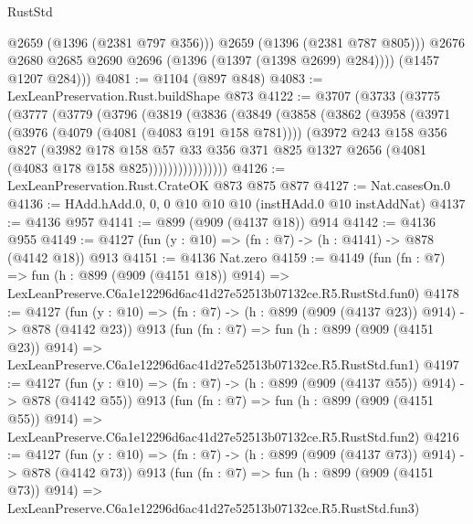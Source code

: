 \begin{lexlean}{RustStd}
\begin{coremodule}
                @2659
                (@1396 (@2381 @797 @356)))
              @2659
              (@1396 (@2381 @787 @805)))
            @2676
            @2680
            @2685
            @2690
            @2696
            (@1396 (@1397 (@1398 @2699) @284))))
        (@1457 @1207 @284)))
@4081 := @1104 (@897 @848)
@4083 := LexLeanPreservation.Rust.buildShape @873
@4122 := @3707
    (@3733
      (@3775
        (@3777
          (@3779
            (@3796
              (@3819
                (@3836
                  (@3849
                    (@3858
                      (@3862
                        (@3958
                          (@3971
                            (@3976 (@4079 (@4081 (@4083 @191 @158 @781))))
                            (@3972
                              @243
                              @158
                              @356
                              @827
                              (@3982
                                @178
                                @158
                                @57
                                @33
                                @356
                                @371
                                @825
                                @1327
                                @2656
                                (@4081 (@4083 @178 @158 @825))))))))))))))))
@4126 := LexLeanPreservation.Rust.CrateOK @873 @875 @877
@4127 := Nat.casesOn.{0}
@4136 := HAdd.hAdd.{0, 0, 0} @10 @10 @10 (instHAdd.{0} @10 instAddNat)
@4137 := @4136 @957
@4141 := @899 (@909 (@4137 @18)) @914
@4142 := @4136 @955
@4149 := @4127 (fun (y : @10) => (fn : @7) -> (h : @4141) -> @878 (@4142 @18)) @913
@4151 := @4136 Nat.zero
@4159 := @4149
    (fun (fn : @7) =>
    fun (h : @899 (@909 (@4151 @18)) @914) =>
    LexLeanPreserve.C6a1e12296d6ac41d27e52513b07132ce.R5.RustStd.fun0)
@4178 := @4127
    (fun (y : @10) => (fn : @7) -> (h : @899 (@909 (@4137 @23)) @914) -> @878 (@4142 @23))
    @913
    (fun (fn : @7) =>
    fun (h : @899 (@909 (@4151 @23)) @914) =>
    LexLeanPreserve.C6a1e12296d6ac41d27e52513b07132ce.R5.RustStd.fun1)
@4197 := @4127
    (fun (y : @10) => (fn : @7) -> (h : @899 (@909 (@4137 @55)) @914) -> @878 (@4142 @55))
    @913
    (fun (fn : @7) =>
    fun (h : @899 (@909 (@4151 @55)) @914) =>
    LexLeanPreserve.C6a1e12296d6ac41d27e52513b07132ce.R5.RustStd.fun2)
@4216 := @4127
    (fun (y : @10) => (fn : @7) -> (h : @899 (@909 (@4137 @73)) @914) -> @878 (@4142 @73))
    @913
    (fun (fn : @7) =>
    fun (h : @899 (@909 (@4151 @73)) @914) =>
    LexLeanPreserve.C6a1e12296d6ac41d27e52513b07132ce.R5.RustStd.fun3)

\end{coremodule}
\end{lexlean}
